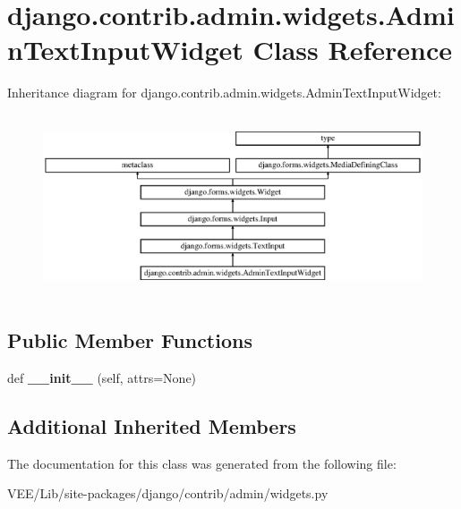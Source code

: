 \hypertarget{classdjango_1_1contrib_1_1admin_1_1widgets_1_1_admin_text_input_widget}{}\section{django.\+contrib.\+admin.\+widgets.\+Admin\+Text\+Input\+Widget Class Reference}
\label{classdjango_1_1contrib_1_1admin_1_1widgets_1_1_admin_text_input_widget}
Inheritance diagram for django.\+contrib.\+admin.\+widgets.\+Admin\+Text\+Input\+Widget\+:\begin{figure}[H]
\begin{center}
\leavevmode
\includegraphics[height=5.401929cm]{classdjango_1_1contrib_1_1admin_1_1widgets_1_1_admin_text_input_widget}
\end{center}
\end{figure}
\subsection*{Public Member Functions}
\begin{DoxyCompactItemize}
\item 
\mbox{\label{classdjango_1_1contrib_1_1admin_1_1widgets_1_1_admin_text_input_widget_ad66bfe5bbde88adbe69f49ea563a0e63}} 
def {\bfseries \+\_\+\+\_\+init\+\_\+\+\_\+} (self, attrs=None)
\end{DoxyCompactItemize}
\subsection*{Additional Inherited Members}


The documentation for this class was generated from the following file\+:\begin{DoxyCompactItemize}
\item 
V\+E\+E/\+Lib/site-\/packages/django/contrib/admin/widgets.\+py\end{DoxyCompactItemize}
